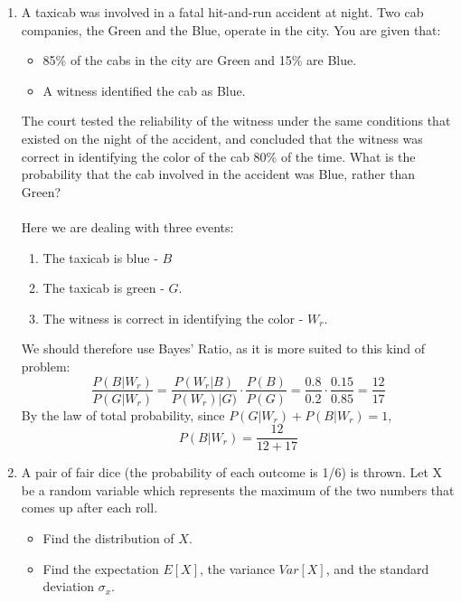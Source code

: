 \documentclass[12pt]{article}
\begin{document}
\begin{enumerate}
\newpage
\item A taxicab was involved in a fatal hit-and-run accident at night. Two cab companies, the Green and the Blue, operate in the city.  You are given that:
\begin{itemize}
  \item 85\% of the cabs in the city are Green and 15\% are Blue.
  \item A witness identified the cab as Blue.
\end{itemize}
The court tested the reliability of the witness under the same conditions that existed on the night of the accident, and concluded that the witness was correct in identifying the color of the cab 80\% of the time.  What is the probability that the cab involved in the accident was Blue, rather than Green?
\\ \\
Here we are dealing with three events:
\begin{enumerate}
  \item The taxicab is blue - $B$
  \item The taxicab is green - $G$.
  \item The witness is correct in identifying the color - $W_r$.
\end{enumerate}
We should therefore use Bayes' Ratio, as it is more suited to this kind of problem:
\[ \frac{P(B|W_r)}{P(G|W_r)} = \frac{P(W_r|B)}{P(W_r)|G)} \cdot \frac{P(B)}{P(G)} = \frac{0.8}{0.2} \cdot \frac{0.15}{0.85} = \frac{12}{17} \]
By the law of total probability, since \( P(G|W_r) + P(B|W_r) = 1 \),
\[ P(B|W_r) = \frac{12}{12+17} \]
\newpage
\item A pair of fair dice (the probability of each outcome is 1/6) is thrown. Let X be a random variable which represents the maximum of the two numbers that comes up after each roll.
\begin{itemize}
\item Find the distribution of $X$.
\item Find the expectation $E[X]$, the variance $Var[X]$, and the standard deviation $\sigma_x$.

\end{itemize}
\end{enumerate}
\end{document}
